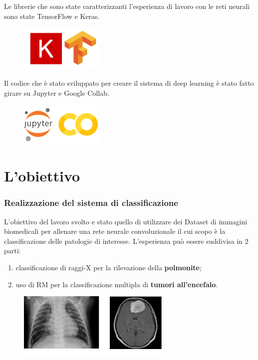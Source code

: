 \documentclass{beamer}
\begin{document}
\begin{frame}
	\frametitle{}
	Le librerie che sono state caratterizzanti l’esperienza di lavoro con le reti neurali sono state
TensorFlow e Keras.
\begin{figure}
	\includegraphics[width=0.35\textwidth]{keras-tf.jpg}
	
\end{figure}
Il codice che è stato sviluppato per creare il sistema di deep learning è stato fatto girare su Jupyter e Google Collab.
\begin{figure}
	\includegraphics[width=0.35\textwidth]{jupyter e collab.png}
	
\end{figure}

	
\end{frame}

\section{L'obiettivo}
\begin{frame}
	\frametitle{Realizzazione del sistema di classificazione}
	L’obiettivo del lavoro svolto e stato quello di utilizzare dei Dataset di immagini
	biomedicali per allenare una rete neurale convoluzionale il cui scopo è la
	classificazione delle patologie di interesse.
	L'esperienza può essere suddivisa in 2 parti:
	\begin{enumerate}
		\item classificazione di raggi-X per la rilevazione della \textbf{polmonite};
		\item uso di RM per la classificazione multipla di \textbf{tumori all'encefalo}.
	\end{enumerate}
	\begin{figure}
		\includegraphics[width=0.65\textwidth]{virus.JPEG}
		
	\end{figure}


	
\end{frame}
\end{document}
